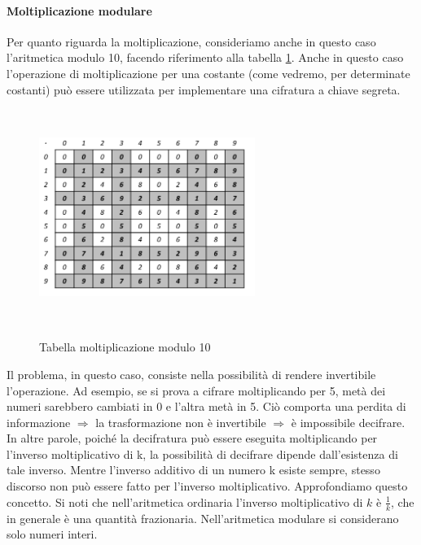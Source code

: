 \paragraph{Moltiplicazione modulare}
Per quanto riguarda la moltiplicazione, consideriamo anche in questo caso l'aritmetica modulo 10, facendo riferimento alla tabella \ref{fig:molt_mod}. Anche in questo caso l'operazione di moltiplicazione per una costante (come vedremo, per determinate costanti) può essere utilizzata per implementare una cifratura a chiave segreta.
\begin{figure}[htbp]
	\centering%
	\subfigure%
	{\includegraphics[height=7cm, width=7cm, keepaspectratio]{Immagini/chiave_pubblica/molt_mod.png}}
	\caption{Tabella moltiplicazione modulo 10 \label{fig:molt_mod}} 	
\end{figure}
Il problema, in questo caso, consiste nella possibilità di rendere invertibile l'operazione. Ad esempio, se si prova a cifrare moltiplicando per 5, metà dei numeri sarebbero cambiati in 0 e l'altra metà in 5. Ciò comporta una perdita di informazione $\Rightarrow$ la trasformazione non è invertibile $\Rightarrow$ è impossibile decifrare.
\newline \newline
In altre parole, poiché la decifratura può essere eseguita moltiplicando per l'inverso moltiplicativo di k, la possibilità di decifrare dipende dall'esistenza di tale inverso. Mentre l'inverso additivo di un numero k esiste sempre, stesso discorso non può essere fatto per l'inverso moltiplicativo. Approfondiamo questo concetto. 
\newline \newline
Si noti che nell'aritmetica ordinaria l'inverso moltiplicativo di $k$ è $\frac{1}{k}$, che in generale è una quantità frazionaria. Nell'aritmetica modulare si considerano solo numeri interi.

